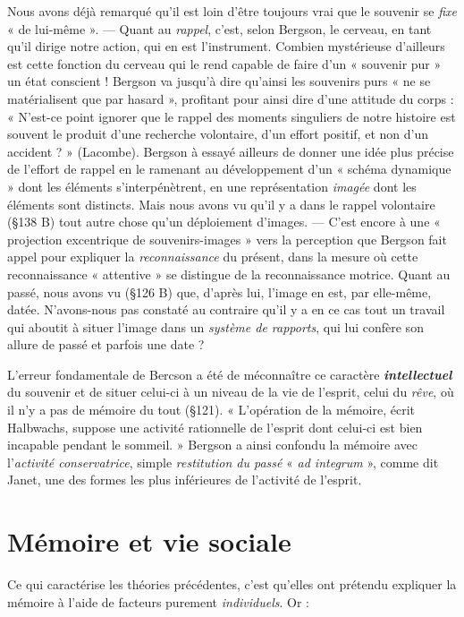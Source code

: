\vspace{0.24cm}
{\footnotesize 
Nous avons déjà remarqué qu'il est loin d’être toujours vrai que le souvenir
se {\it fixe} « de lui-même ». — Quant au {\it rappel}, c’est, selon Bergson,
le cerveau, en tant qu’il dirige notre action, qui en est l'instrument. Combien
mystérieuse d’ailleurs est cette fonction du cerveau qui le rend capable de
faire d'un « souvenir pur » un état conscient ! Bergson va jusqu’à dire
qu’ainsi les souvenirs purs « ne se matérialisent que par hasard », profitant
pour ainsi dire d’une attitude du corps : « N'est-ce point ignorer que le rappel
des moments singuliers de notre histoire est souvent le produit d’une
recherche volontaire, d’un effort positif, et non d’un accident ? » (Lacombe).
Bergson à essayé ailleurs de donner une idée plus précise de l'effort de rappel
en le ramenant au développement d’un « schéma dynamique » dont les éléments
s’interpénètrent, en une représentation {\it imagée} dont les éléments
sont distincts. Mais nous avons vu qu’il y a dans le rappel volontaire
(\S 138 B) tout autre chose qu’un déploiement d'images. — C’est encore à
une « projection excentrique de souvenirs-images » vers la perception que
Bergson fait appel pour expliquer la {\it reconnaissance} du présent, dans la
mesure où cette reconnaissance « attentive » se distingue de la reconnaissance
motrice. Quant au passé, nous avons vu (\S 126 B) que, d’après lui,
l'image en est, par elle-même, datée. N’avons-nous pas constaté au contraire
qu’il y a en ce cas tout un travail qui aboutit à situer l'image dans un
{\it système de rapports}, qui lui confère son allure de passé et parfois une date ?}
\vspace{0.31cm}

L'erreur fondamentale de Bercson a été de méconnaître ce caractère
\textbf{\textit {intellectuel}} du souvenir et de situer celui-ci à un niveau de la
vie de l’esprit, celui du {\it rêve}, où il n’y a pas de mémoire du tout (\S121).
« L'opération de la mémoire, écrit Halbwachs, suppose une activité
rationnelle de l’esprit dont celui-ci est bien incapable pendant le
sommeil. » Bergson a ainsi confondu la mémoire avec l’{\it activité conservatrice},
simple {\it restitution du passé} « {\it ad integrum} », comme dit Janet,
une des formes les plus inférieures de l’activité de l’esprit.

\section{Mémoire et vie sociale}%
Ce qui caractérise les théories
précédentes, c’est qu’elles ont prétendu expliquer la mémoire à l’aide
de facteurs purement {\it individuels}. Or :

